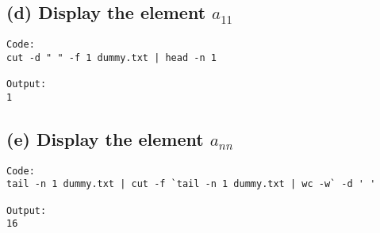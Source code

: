 \subsection*{(d) Display the element $a_{11}$}
\begin{verbatim}
Code: 
cut -d " " -f 1 dummy.txt | head -n 1

Output: 
1
\end{verbatim}

\subsection*{(e) Display the element $a_{nn}$}
\begin{verbatim}
Code: 
tail -n 1 dummy.txt | cut -f `tail -n 1 dummy.txt | wc -w` -d ' '

Output: 
16
\end{verbatim}







